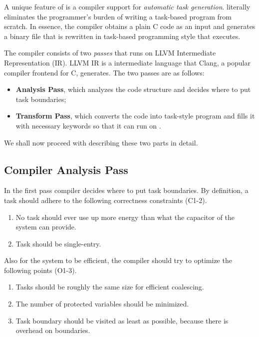 A unique feature of \sys is a compiler support for \emph{automatic task generation}. \sys literally eliminates the programmer's burden of writing a task-based program from scratch. In essence, the \sys compiler obtains a plain C code as an input and generates a binary file that is rewritten in task-based programming style that \sys executes.

The compiler consists of two {\em passes} that runs on LLVM Intermediate Representation (IR). LLVM IR is a intermediate language that Clang, a popular compiler frontend for C, generates.
The two passes are as follows:
%
\begin{itemize}
	\item \textbf{Analysis Pass}, which analyzes the code structure and decides where to put task boundaries;
	\item \textbf{Transform Pass}, which converts the code into task-style program and fills it with necessary \sys keywords so that it can run on \sys.
\end{itemize}
%
We shall now proceed with describing these two parts in detail.

\subsection{Compiler Analysis Pass}
\label{sec:compiler_analysis_pass}

In the first pass \sys compiler decides where to put task boundaries. By definition, a \sys task should adhere to the following correctness constraints (C1-2).

\begin{enumerate}[label={\bf C\arabic*:}]
\item{No task should ever use up more energy than what the capacitor of the system can provide.} 
\item{Task should be single-entry.}
\end{enumerate}

Also for the system to be efficient, the compiler should try to optimize the following points (O1-3).

\begin{enumerate}[label={\bf O\arabic*:}]
\item{Tasks should be roughly the same size for efficient coalescing.}
\item{The number of protected variables should be minimized.}
\item{Task boundary should be visited as least as possible, because there is overhead on boundaries.}
\end{enumerate} 

